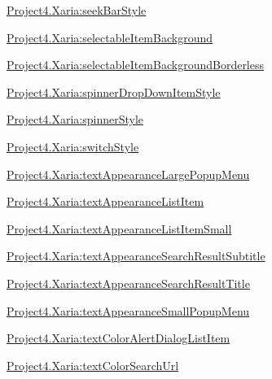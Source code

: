 {\ttfamily \hyperlink{classproject4_1_1xaria_1_1R_1_1styleable_a443f701138b45301d896b25f88f24834}{Project4.\+Xaria\+:seek\+Bar\+Style}}

{\ttfamily \hyperlink{classproject4_1_1xaria_1_1R_1_1styleable_ad619b68b2480af24fe678380486bcf3e}{Project4.\+Xaria\+:selectable\+Item\+Background}}

{\ttfamily \hyperlink{classproject4_1_1xaria_1_1R_1_1styleable_ab2466f3fbbecad455aa1db2f009363f0}{Project4.\+Xaria\+:selectable\+Item\+Background\+Borderless}}

{\ttfamily \hyperlink{classproject4_1_1xaria_1_1R_1_1styleable_afdbe9190461391839d559af54a7397ed}{Project4.\+Xaria\+:spinner\+Drop\+Down\+Item\+Style}}

{\ttfamily \hyperlink{classproject4_1_1xaria_1_1R_1_1styleable_a918d109191c529fed6f95201986203af}{Project4.\+Xaria\+:spinner\+Style}}

{\ttfamily \hyperlink{classproject4_1_1xaria_1_1R_1_1styleable_a33d0593c2cd3f80d60995b4580bed2db}{Project4.\+Xaria\+:switch\+Style}}

{\ttfamily \hyperlink{classproject4_1_1xaria_1_1R_1_1styleable_a0f3ef906935af92b8a0555a151cdb0a4}{Project4.\+Xaria\+:text\+Appearance\+Large\+Popup\+Menu}}

{\ttfamily \hyperlink{classproject4_1_1xaria_1_1R_1_1styleable_aa6c67f0600a5d8caedaf5e80e8a4acb7}{Project4.\+Xaria\+:text\+Appearance\+List\+Item}}

{\ttfamily \hyperlink{classproject4_1_1xaria_1_1R_1_1styleable_adc238aae83f2e253317ab04cf7aa7ef5}{Project4.\+Xaria\+:text\+Appearance\+List\+Item\+Small}}

{\ttfamily \hyperlink{classproject4_1_1xaria_1_1R_1_1styleable_ac77446b89989c34ed15642f5e5860c71}{Project4.\+Xaria\+:text\+Appearance\+Search\+Result\+Subtitle}}

{\ttfamily \hyperlink{classproject4_1_1xaria_1_1R_1_1styleable_a489601ae9406c0857de192f2c579d01f}{Project4.\+Xaria\+:text\+Appearance\+Search\+Result\+Title}}

{\ttfamily \hyperlink{classproject4_1_1xaria_1_1R_1_1styleable_a0b2edd58e797e1a0b12ec98975f7b355}{Project4.\+Xaria\+:text\+Appearance\+Small\+Popup\+Menu}}

{\ttfamily \hyperlink{classproject4_1_1xaria_1_1R_1_1styleable_aea2ca8637844e7e15e92fc8a9341e92d}{Project4.\+Xaria\+:text\+Color\+Alert\+Dialog\+List\+Item}}

{\ttfamily \hyperlink{classproject4_1_1xaria_1_1R_1_1styleable_aabbc8b91c6cabb8ea2973b309f65c63c}{Project4.\+Xaria\+:text\+Color\+Search\+Url}}

